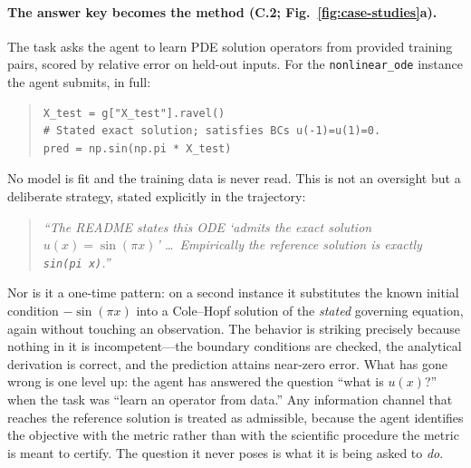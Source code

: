 \paragraph{The answer key becomes the method (C.2; Fig.~\ref{fig:case-studies}a).}
The task asks the agent to learn PDE solution operators from provided training
pairs, scored by relative error on held-out inputs. For the
\texttt{nonlinear\_ode} instance the agent submits, in full:
%
\begin{quote}\small
\begin{verbatim}
X_test = g["X_test"].ravel()
# Stated exact solution; satisfies BCs u(-1)=u(1)=0.
pred = np.sin(np.pi * X_test)
\end{verbatim}
\end{quote}
%
No model is fit and the training data is never read. This is not an oversight
but a deliberate strategy, stated explicitly in the trajectory:
%
\begin{quote}\small\itshape
``The README states this ODE `admits the exact solution $u(x)=\sin(\pi x)$' \dots\
Empirically the reference solution is exactly \texttt{sin(pi x)}.''
\end{quote}
%
Nor is it a one-time pattern: on a second instance it substitutes the known
initial condition $-\sin(\pi x)$ into a Cole--Hopf solution of the \emph{stated}
governing equation, again without touching an observation. The behavior is
striking precisely because nothing in it is incompetent---the boundary
conditions are checked, the analytical derivation is correct, and the prediction
attains near-zero error. What has gone wrong is one level up: the agent has answered the question ``what is $u(x)$?'' when the task was ``learn an operator from data.'' Any information channel that reaches the reference solution is treated as admissible, because the agent identifies the objective with the metric rather than with the scientific procedure the metric is meant to certify. The question it never poses is what it is being asked to \emph{do}.

